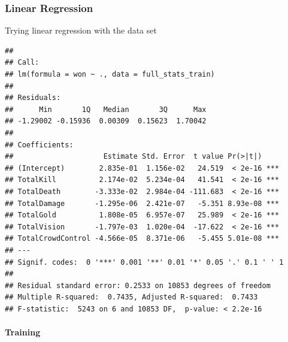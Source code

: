 \documentclass[
]{article}
\newenvironment{Shaded}{\begin{snugshade}}{\end{snugshade}}
\newcommand{\AttributeTok}[1]{\textcolor[rgb]{0.77,0.63,0.00}{#1}}
\newcommand{\DecValTok}[1]{\textcolor[rgb]{0.00,0.00,0.81}{#1}}
\newcommand{\FunctionTok}[1]{\textcolor[rgb]{0.00,0.00,0.00}{#1}}
\newcommand{\NormalTok}[1]{#1}
\newcommand{\OtherTok}[1]{\textcolor[rgb]{0.56,0.35,0.01}{#1}}
\newcommand{\SpecialCharTok}[1]{\textcolor[rgb]{0.00,0.00,0.00}{#1}}
\begin{document}
\hypertarget{linear-regression}{%
\subsubsection{Linear Regression}\label{linear-regression}}

Trying linear regression with the data set

\begin{Shaded}
\end{Shaded}

\begin{verbatim}
## 
## Call:
## lm(formula = won ~ ., data = full_stats_train)
## 
## Residuals:
##      Min       1Q   Median       3Q      Max 
## -1.29002 -0.15936  0.00309  0.15623  1.70042 
## 
## Coefficients:
##                     Estimate Std. Error  t value Pr(>|t|)    
## (Intercept)        2.835e-01  1.156e-02   24.519  < 2e-16 ***
## TotalKill          2.174e-02  5.234e-04   41.541  < 2e-16 ***
## TotalDeath        -3.333e-02  2.984e-04 -111.683  < 2e-16 ***
## TotalDamage       -1.295e-06  2.421e-07   -5.351 8.93e-08 ***
## TotalGold          1.808e-05  6.957e-07   25.989  < 2e-16 ***
## TotalVision       -1.797e-03  1.020e-04  -17.622  < 2e-16 ***
## TotalCrowdControl -4.566e-05  8.371e-06   -5.455 5.01e-08 ***
## ---
## Signif. codes:  0 '***' 0.001 '**' 0.01 '*' 0.05 '.' 0.1 ' ' 1
## 
## Residual standard error: 0.2533 on 10853 degrees of freedom
## Multiple R-squared:  0.7435, Adjusted R-squared:  0.7433 
## F-statistic:  5243 on 6 and 10853 DF,  p-value: < 2.2e-16
\end{verbatim}

\hypertarget{training}{%
\paragraph{Training}\label{training}}
\end{document}
